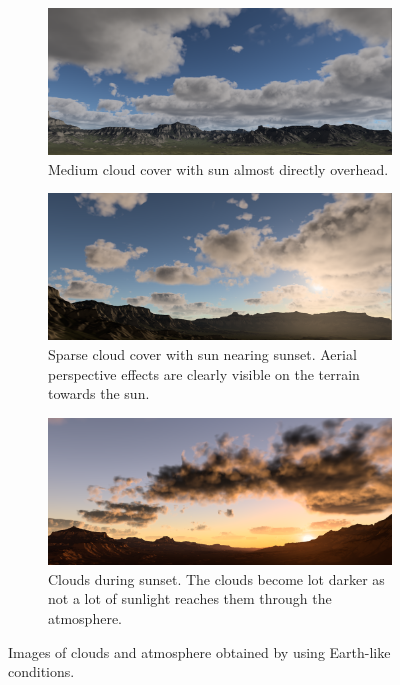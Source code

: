 \documentclass{ctuthesis}
\begin{document}
\begin{figure}[h!]
     \centering
     \begin{subfigure}[b]{1.0\textwidth}
         \centering
         \includegraphics[width=\textwidth]{media/Earth_like_result_1.png}
         \caption{Medium cloud cover with sun almost directly overhead.}
         \label{fig:Earth-like medium cloud cover}
     \end{subfigure}
     \quad
     \begin{subfigure}[b]{1.0\textwidth}
         \centering
         \includegraphics[width=\textwidth]{media/Earth_like_result_2.png}
         \caption{Sparse cloud cover with sun nearing sunset. Aerial perspective 
         effects are clearly visible on the terrain towards the sun.}
         \label{fig:Earth-like sparse cloud cover}
     \end{subfigure}
     \quad
     \begin{subfigure}[b]{1.0\textwidth}
         \centering
         \includegraphics[width=\textwidth]{media/Earth_like_result_3.png}
         \caption{Clouds during sunset. The clouds become lot darker as not a lot of sunlight
         reaches them through the atmosphere. }
         \label{fig:Earth-like sunset}
     \end{subfigure}
        \caption[Earth-like results with clear weather]{Images of clouds and atmosphere obtained by using Earth-like conditions.}
        \label{fig:Earth-like results}
\end{figure}
\end{document}

